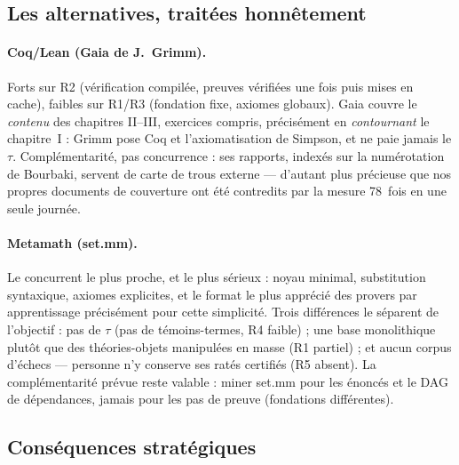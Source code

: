 \subsection{Les alternatives, traitées honnêtement}

\paragraph{Coq/Lean (Gaia de J.~Grimm).} Forts sur R2 (vérification compilée,
preuves vérifiées une fois puis mises en cache), faibles sur R1/R3 (fondation
fixe, axiomes globaux). Gaia couvre le \emph{contenu} des chapitres II--III,
exercices compris, précisément en \emph{contournant} le chapitre~I : Grimm pose
Coq et l'axiomatisation de Simpson, et ne paie jamais le $\tau$. Complémentarité,
pas concurrence : ses rapports, indexés sur la numérotation de Bourbaki, servent
de carte de trous externe --- d'autant plus précieuse que nos propres documents
de couverture ont été contredits par la mesure 78~fois en une seule journée.

\paragraph{Metamath (set.mm).} Le concurrent le plus proche, et le plus sérieux :
noyau minimal, substitution syntaxique, axiomes explicites, et le format le plus
apprécié des provers par apprentissage précisément pour cette simplicité. Trois
différences le séparent de l'objectif : pas de $\tau$ (pas de témoins-termes,
R4 faible) ; une base monolithique plutôt que des théories-objets manipulées en
masse (R1 partiel) ; et aucun corpus d'échecs --- personne n'y conserve ses
ratés certifiés (R5 absent). La complémentarité prévue reste valable : miner
set.mm pour les énoncés et le DAG de dépendances, jamais pour les pas de preuve
(fondations différentes).

\subsection{Conséquences stratégiques}

